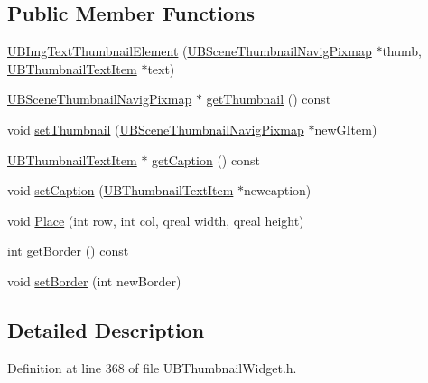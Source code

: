 \subsection*{Public Member Functions}
\begin{DoxyCompactItemize}
\item 
\hyperlink{class_u_b_img_text_thumbnail_element_a9fdcc998c31b98c53436aff19b00ccd0}{U\-B\-Img\-Text\-Thumbnail\-Element} (\hyperlink{class_u_b_scene_thumbnail_navig_pixmap}{U\-B\-Scene\-Thumbnail\-Navig\-Pixmap} $\ast$thumb, \hyperlink{class_u_b_thumbnail_text_item}{U\-B\-Thumbnail\-Text\-Item} $\ast$text)
\item 
\hyperlink{class_u_b_scene_thumbnail_navig_pixmap}{U\-B\-Scene\-Thumbnail\-Navig\-Pixmap} $\ast$ \hyperlink{class_u_b_img_text_thumbnail_element_af463f9e82caa1cd92041e1072f9ec7fc}{get\-Thumbnail} () const 
\item 
void \hyperlink{class_u_b_img_text_thumbnail_element_abd7b83917e0825105a4d1039221dc674}{set\-Thumbnail} (\hyperlink{class_u_b_scene_thumbnail_navig_pixmap}{U\-B\-Scene\-Thumbnail\-Navig\-Pixmap} $\ast$new\-G\-Item)
\item 
\hyperlink{class_u_b_thumbnail_text_item}{U\-B\-Thumbnail\-Text\-Item} $\ast$ \hyperlink{class_u_b_img_text_thumbnail_element_a7c8777e1df92f3ef6c47c20f85a45388}{get\-Caption} () const 
\item 
void \hyperlink{class_u_b_img_text_thumbnail_element_af5519fc379ef974b1078b0178453f3a9}{set\-Caption} (\hyperlink{class_u_b_thumbnail_text_item}{U\-B\-Thumbnail\-Text\-Item} $\ast$newcaption)
\item 
void \hyperlink{class_u_b_img_text_thumbnail_element_a9957e6410bb70e4c9011ee67a48516ab}{Place} (int row, int col, qreal width, qreal height)
\item 
int \hyperlink{class_u_b_img_text_thumbnail_element_a98dc74dcc47a658d615a4aa68188a941}{get\-Border} () const 
\item 
void \hyperlink{class_u_b_img_text_thumbnail_element_aed1ed25175ba1e7f8551e5b9812772cc}{set\-Border} (int new\-Border)
\end{DoxyCompactItemize}


\subsection{Detailed Description}


Definition at line 368 of file U\-B\-Thumbnail\-Widget.\-h.




